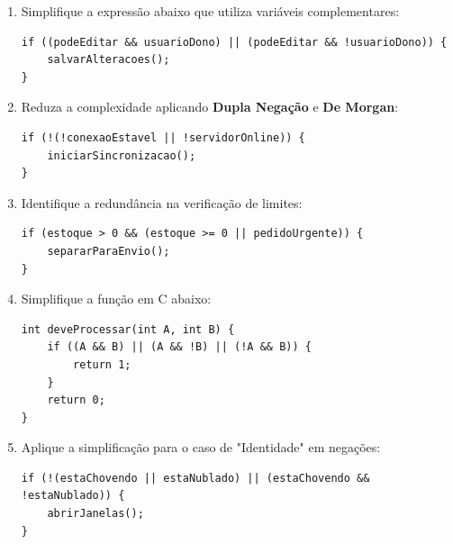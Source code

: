 \documentclass[12pt]{article}
\begin{document}
\begin{enumerate}[label=\textbf{\arabic*.}]
\vspace{0.1cm}


\item Simplifique a expressão abaixo que utiliza variáveis complementares:
\begin{codeblock}
\begin{verbatim}
if ((podeEditar && usuarioDono) || (podeEditar && !usuarioDono)) {
    salvarAlteracoes();
}
\end{verbatim}
\end{codeblock}

\vspace{0.1cm}



\item Reduza a complexidade aplicando \textbf{Dupla Negação} e \textbf{De Morgan}:
\begin{codeblock}
\begin{verbatim}
if (!(!conexaoEstavel || !servidorOnline)) {
    iniciarSincronizacao();
}
\end{verbatim}
\end{codeblock}

\vspace{0.1cm}


\item Identifique a redundância na verificação de limites:
\begin{codeblock}
\begin{verbatim}
if (estoque > 0 && (estoque >= 0 || pedidoUrgente)) {
    separarParaEnvio();
}
\end{verbatim}
\end{codeblock}

\vspace{0.1cm}

\item Simplifique a função em C abaixo:

\begin{codeblock}
\begin{verbatim}
int deveProcessar(int A, int B) {
    if ((A && B) || (A && !B) || (!A && B)) {
        return 1;
    }
    return 0;
}
\end{verbatim}
\end{codeblock}

\vspace{0.2cm}

\vspace{0.1cm}


\item Aplique a simplificação para o caso de "Identidade" em negações:
\begin{codeblock}
\begin{verbatim}
if (!(estaChovendo || estaNublado) || (estaChovendo && !estaNublado)) {
    abrirJanelas();
}
\end{verbatim}
\end{codeblock}


\end{enumerate}
\end{document}
